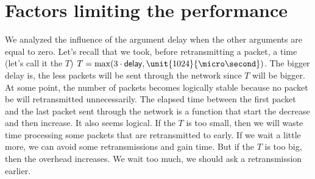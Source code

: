 \documentclass[10pt,a4paper]{article}
\begin{document}
\section{Factors limiting the performance}

We analyzed the influence of the argument delay when the other arguments are equal to zero. Let's recall that we took, before retransmitting a packet, a time (let's call it the $T$) $T = \max(3 \cdot \mathsf{delay}, \unit{1024}{\micro\second})$.  The bigger delay is, the less packets will be sent through the network since $T$ will be bigger. At some point, the number of packets becomes logically stable because no packet be will retransmitted unnecessarily. The elapsed time between the first packet and the last packet sent through the network is a function that start the decrease and then increase. It also seems logical. If the $T$ is too small, then we will waste time processing some packets that are retransmitted to early. If we wait a little more, we can avoid some retransmissions and gain time. But if the $T$ is too big, then the overhead increases. We wait too much, we should ask a retransmission earlier.
\end{document}

